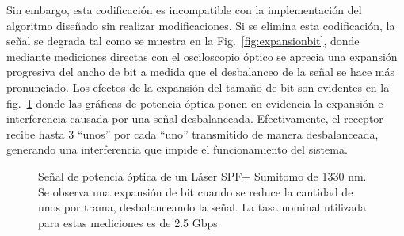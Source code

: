 Sin embargo, esta codificación es incompatible con la implementación del algoritmo diseñado sin realizar modificaciones. Si se elimina esta codificación, la señal se degrada tal como se muestra en la Fig.~\ref{fig:expansionbit}, donde mediante mediciones directas con el osciloscopio óptico se aprecia una expansión progresiva del ancho de bit a medida que el desbalanceo de la señal se hace más pronunciado. Los efectos de la expansión del tamaño de bit son evidentes en la fig.~\ref{fig:ImgExpansion} donde las gráficas de potencia óptica ponen en evidencia la expansión e interferencia causada por una señal desbalanceada.
Efectivamente, el receptor recibe hasta 3 ``unos'' por cada ``uno'' transmitido de manera desbalanceada, generando una interferencia que impide el funcionamiento del sistema.


\begin{figure}[!t]
   \centering
   \qquad
   \qquad
  \caption {Señal de potencia óptica de un Láser SPF+ Sumitomo de 1330 nm. Se observa una expansión de bit cuando se reduce la cantidad de unos por trama, desbalanceando la señal. La tasa nominal utilizada para estas mediciones es de 2.5 Gbps}
  \label{fig:ImgExpansion}
\end{figure}

